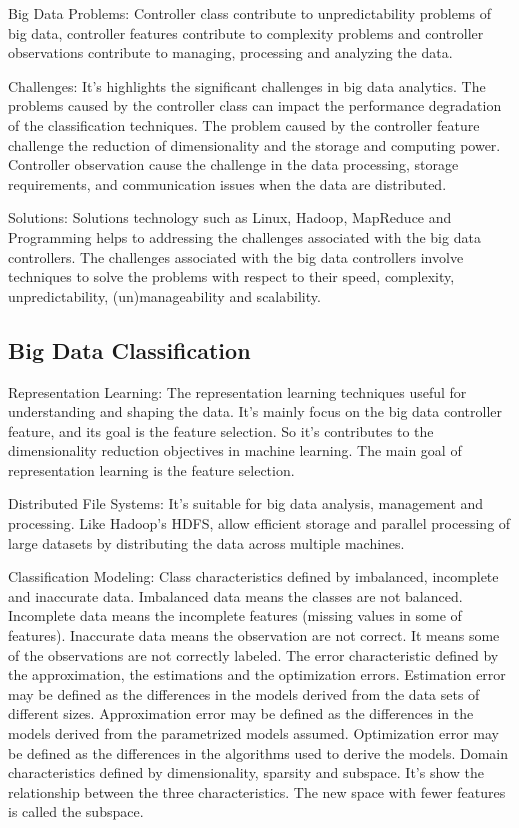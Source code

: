 \documentclass[conference,12pt]{IEEEtran}
\begin{document}
Big Data Problems: Controller class contribute to unpredictability problems of big data, controller features contribute to complexity problems and controller  observations contribute to managing, processing and analyzing the data.

Challenges: It’s highlights the significant challenges in big data analytics. The problems caused by the controller class can impact the performance degradation of the classification techniques. The problem caused by the controller feature challenge the reduction of dimensionality and the storage and computing power. Controller observation cause the challenge in the data processing, storage requirements, and communication issues when the data are distributed.

Solutions: Solutions technology such as Linux, Hadoop, MapReduce and Programming helps to addressing the challenges associated with the big data controllers. The challenges associated with the big data controllers involve techniques to solve the problems with respect to their speed, complexity, unpredictability, (un)manageability and scalability.

\subsection{Big Data Classification}
Representation Learning: The representation learning techniques useful for understanding and shaping the data. It’s mainly focus on the big data controller feature, and its goal is the feature selection. So it’s contributes to the dimensionality reduction objectives in machine learning. The main goal of representation learning is the feature selection.

Distributed File Systems: It’s suitable for big data analysis, management and processing. Like Hadoop's HDFS, allow efficient storage and parallel processing of large datasets by distributing the data across multiple machines.

Classification Modeling: Class characteristics defined by imbalanced, incomplete and inaccurate data. Imbalanced data means the classes are not balanced. Incomplete data means the incomplete features (missing values in some of features). Inaccurate data means the observation are not correct. It means some of the observations are not correctly labeled. The error characteristic defined by the approximation, the estimations and the optimization errors. Estimation error may be defined as the differences in the models derived from the data sets of different sizes. Approximation error
may be defined as the differences in the models derived from the parametrized models assumed. Optimization error may be
defined as the differences in the algorithms used to derive the models. Domain characteristics defined by dimensionality, sparsity and subspace. It’s show the relationship between the three characteristics. The new space with fewer features is called the subspace.
\end{document}
